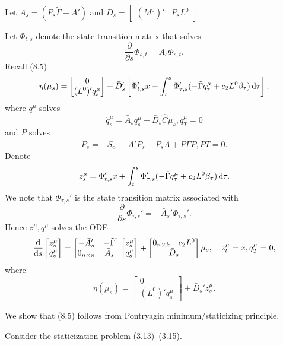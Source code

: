 \documentclass{article}
\newcommand\diff[2]{\frac{{\rm d}{#1}}{{\rm d}{#2}}}
\newcommand\pdiff[2]{\frac{\partial{#1}}{\partial{#2}}}
\begin{document}
Let $\bar{A}_s = (P_s \tilde{\Gamma} - A')$ and $\bar{D}_s = \begin{bmatrix} (M^0)' & P_s L^0\end{bmatrix}$.

Let $\Phi_{t, s}$ denote the state transition matrix that solves
\[
\pdiff{}{s}\Phi_{s, t} = \bar{A}_s \Phi_{s, t}.
\]
Recall (8.5)
\[
\eta(\mu_s) = \begin{bmatrix}0 \\ (L^0)' q^\mu_s\end{bmatrix} + \bar{D}_s' \left[\Phi_{t, s}' x + \int_t^s \Phi_{\tau, s}' (-\tilde{\Gamma} q^\mu_\tau + c_2 L^0 \beta_\tau)\,{\rm d}\tau\right],
\]
where $q^\mu$ solves
\[
\dot{q}^\mu_s = \bar{A}_s q^\mu_s - \bar{D}_s \hat{C} \mu_s, q^\mu_T = 0
\]
and $P$ solves
\[
\dot{P}_s = -S_{c_1} - A' P_s - P_s A + P \tilde{\Gamma} P, PT = 0.
\]
Denote
\[
z^\mu_s = \Phi_{t, s}' x + \int_t^s \Phi_{\tau, s}' (-\tilde{\Gamma} q^\mu_\tau + c_2 L^0 \beta_\tau)\,{\rm d}\tau.
\]
We note that $\Phi_{\tau, s}'$ is the state transition matrix associated with
\[
\pdiff{}{s} \Phi_{\tau, s}' = -\bar{A}_s' \Phi_{\tau, s}'.
\]
Hence $z^\mu, q^\mu$ solves the ODE
\begin{equation}\label{eq:paper_ODE}
\diff{}{s} \begin{bmatrix}z^\mu_s \\ q^\mu_s\end{bmatrix} = \begin{bmatrix}-\bar{A}_s' & -\tilde{\Gamma}\\0_{n \times n} & \bar{A}_s\end{bmatrix} \begin{bmatrix}z^\mu_s \\ q^\mu_s\end{bmatrix} + \begin{bmatrix}0_{n \times k} & c_2 L^0\\\multicolumn{2}{c}{\bar{D}_s}\end{bmatrix} \mu_s, \quad z^\mu_t = x, q^\mu_T = 0,
\end{equation}
where
\[
\eta(\mu_s) = \begin{bmatrix}0 \\ (L^0)' q^\mu_s\end{bmatrix} + \bar{D}_s' z^\mu_s.
\]

We show that (8.5) follows from Pontryagin minimum/staticizing principle.

Consider the staticization problem (3.13)--(3.15).
\end{document}
